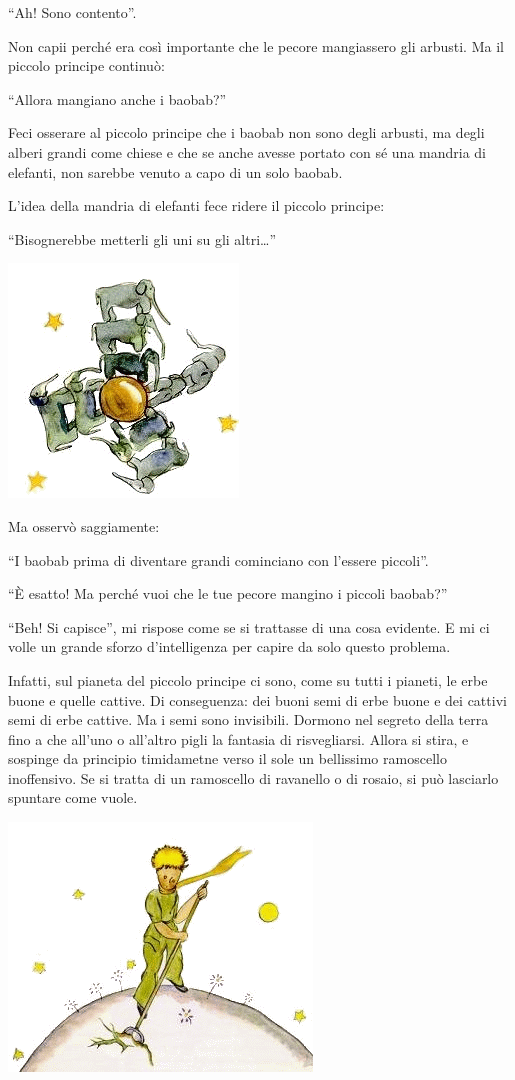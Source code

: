 \documentclass[11pt]{scrbook}
\begin{document}
``Ah! Sono contento''.

Non capii perché era così importante che le pecore mangiassero gli arbusti. Ma il piccolo principe continuò:

``Allora mangiano anche i baobab?''

Feci osserare al piccolo principe che i baobab non sono degli arbusti, ma degli alberi grandi come chiese e che se anche avesse portato con sé una mandria di elefanti, non sarebbe venuto a capo di un solo baobab.

L'idea della mandria di elefanti fece ridere il piccolo principe:

``Bisognerebbe metterli gli uni su gli altri\ldots{}''

\begin{center}
\includegraphics{img/5a}
\end{center}

Ma osservò saggiamente:

``I baobab prima di diventare grandi cominciano con l'essere piccoli''.

``È esatto! Ma perché vuoi che le tue pecore mangino i piccoli baobab?''

``Beh! Si capisce'', mi rispose come se si trattasse di una cosa evidente. E mi ci volle un grande sforzo d'intelligenza per capire da solo questo problema.

Infatti, sul pianeta del piccolo principe ci sono, come su tutti i pianeti, le erbe buone e quelle cattive. Di conseguenza: dei buoni semi di erbe buone e dei cattivi semi di erbe cattive. Ma i semi sono invisibili. Dormono nel segreto della terra fino a che all'uno o all'altro pigli la fantasia di risvegliarsi. Allora si stira, e sospinge da principio timidametne verso il sole un bellissimo ramoscello inoffensivo. Se si tratta di un ramoscello di ravanello o di rosaio, si può lasciarlo spuntare come vuole.

\begin{center}
\includegraphics{img/5b}
\end{center}
\end{document}
